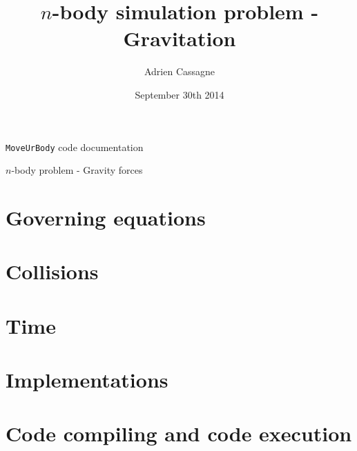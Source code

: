 \documentclass[a4paper,11pt,answers,11pt]{paper}
\title{$n$-body simulation problem - Gravitation}
\author{Adrien Cassagne}
\date{September 30th 2014}
\begin{document}
\begin{title}
	\noindent\makebox[\textwidth][c]{
	}
	\noindent{}
\begin{center}
	{\Large{\texttt{MoveUrBody} code documentation}}\\
\end{center}
\begin{center}
	{\footnotesize{$n$-body problem - Gravity forces}}
\end{center}
\end{title}

\setcounter{page}{1}
\section {Governing equations}


\section {Collisions}


\newpage
\section {Time}


\newpage
\section {Implementations}


\newpage
\section {Code compiling and code execution}

\end{document}
